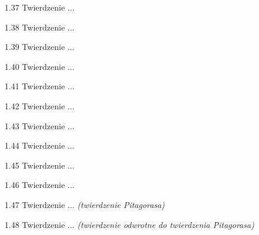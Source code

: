 \begin{enumerate}
    \item [1.37] Twierdzenie ... %
    \item [1.38] Twierdzenie ... %
    \item [1.39] Twierdzenie ... %
    \item [1.40] Twierdzenie ... %
    \item [1.41] Twierdzenie ... %
    \item [1.42] Twierdzenie ... %
    \item [1.43] Twierdzenie ... %
    \item [1.44] Twierdzenie ... %
    \item [1.45] Twierdzenie ... %
    \item [1.46] Twierdzenie ... %
    \item [1.47] Twierdzenie ... \hfill \emph{(twierdzenie Pitagorasa)} %
    \item [1.48] Twierdzenie ... \hfill \emph{(twierdzenie odwrotne do twierdzenia Pitagorasa)} %
\end{enumerate}	